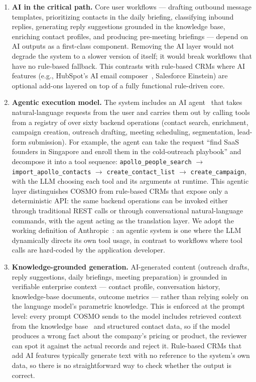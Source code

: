 \documentclass[a4paper]{article}
\begin{document}
\begin{enumerate}
  \item \textbf{AI in the critical path.}
    Core user workflows --- drafting outbound message templates,
    prioritizing contacts in the daily briefing, classifying
    inbound replies, generating reply suggestions grounded in the
    knowledge base, enriching contact profiles, and producing
    pre-meeting briefings --- depend on AI outputs as a first-class
    component. Removing the AI layer would not degrade the system
    to a slower version of itself; it would break workflows that
    have no rule-based fallback. This contrasts with rule-based
    CRMs where AI features (e.g., HubSpot's AI email
    composer~\cite{hubspot_ai_email_creation}, Salesforce Einstein)
    are optional add-ons layered on top of a fully functional
    rule-driven core.

  \item \textbf{Agentic execution model.}
   The system includes an AI agent~\cite{anthropic_agents, russell2020aima}
that takes natural-language requests from the user and carries them out
by calling tools from a registry of over sixty backend operations
 (contact search, enrichment, campaign creation,
    outreach drafting, meeting scheduling, segmentation, lead-form
    submission). For example, the agent can take the request
    ``find SaaS founders in Singapore and enroll them in the
    cold-outreach playbook'' and decompose it into a tool sequence:
    \texttt{apollo\_people\_search} $\rightarrow$
    \texttt{import\_apollo\_contacts} $\rightarrow$
    \texttt{create\_contact\_list} $\rightarrow$
    \texttt{create\_campaign}, with the LLM choosing each tool and
    its arguments at runtime. This agentic layer distinguishes
    COSMO from rule-based CRMs that expose only a deterministic
    API: the same backend operations can be invoked either through
    traditional REST calls or through conversational
    natural-language commands, with the agent acting as the
    translation layer. We adopt the working definition of
    Anthropic~\cite{anthropic_agents}: an agentic system is one
    where the LLM dynamically directs its own tool usage, in
    contrast to workflows where tool calls are hard-coded by the
    application developer.

  \item \textbf{Knowledge-grounded generation.}
    AI-generated content (outreach drafts, reply suggestions, daily
    briefings, meeting preparation) is grounded in verifiable
    enterprise context --- contact profile, conversation history,
    knowledge-base documents, outcome metrics --- rather than
    relying solely on the language model's parametric knowledge.
    This is enforced at the prompt level: every prompt COSMO sends to the
model includes retrieved context from the knowledge base~\cite{lewis2020rag}
and structured contact data, so if the model produces a wrong fact about
the company's pricing or product, the reviewer can spot it against the
actual records and reject it. Rule-based CRMs that add AI features
typically generate text with no reference to the system's own data,
so there is no straightforward way to check whether the output is correct.



\end{enumerate}
\end{document}
